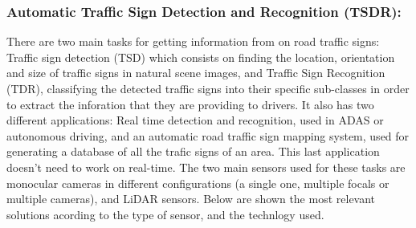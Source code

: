 \subsubsection{Automatic Traffic Sign Detection and Recognition (TSDR):} %
There are two main tasks for getting information from on road traffic signs: Traffic sign detection (TSD) which consists on finding the location, orientation and size of traffic signs in natural scene images, and Traffic Sign Recognition (TDR), classifying the detected traffic signs into their specific sub-classes in order to extract the inforation that they are providing to drivers.
It also has two different applications: Real time detection and recognition, used in ADAS or autonomous driving, and an automatic road traffic sign mapping system, used for generating a database of all the trafic signs of an area. This last application doesn't need to work on real-time. 
The two main sensors used for these tasks are monocular cameras in different configurations (a single one, multiple focals or multiple cameras), and LiDAR sensors.
Below are shown the most relevant solutions acording to the type of sensor, and the technlogy used.

